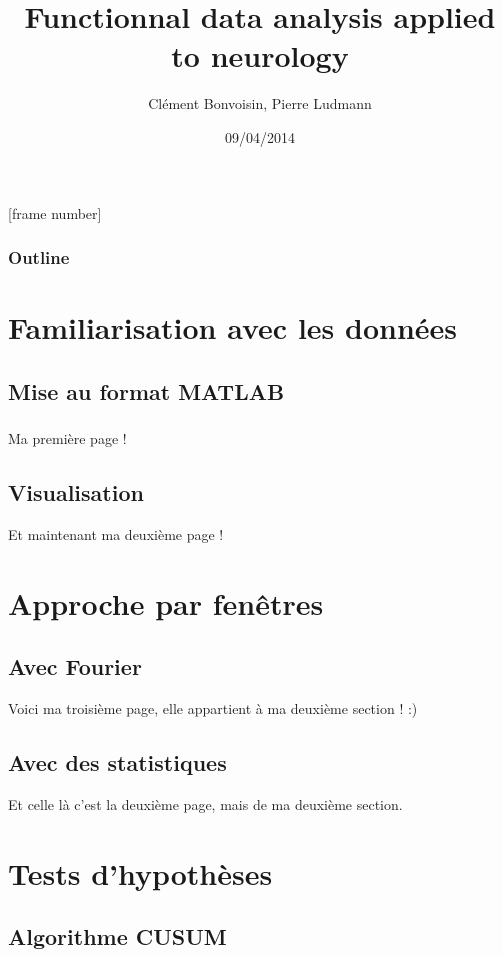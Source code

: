 \documentclass{beamer}
\title[Signal segmentation]{Functionnal data analysis applied to neurology}
\author{Clément Bonvoisin, Pierre Ludmann}
\institute{CMLA (ENS Cachan), Cognac-G (Paris V)}
\date{09/04/2014}
\begin{document}
[frame number]

\begin{frame}
\titlepage
\end{frame}

\begin{frame}
\frametitle{Outline}
  \tableofcontents[hideallsubsections]
\end{frame}


\section{Familiarisation avec les données}
\subsection{Mise au format MATLAB}

\begin{frame}
\frametitle{}
Ma première page !
\insertframenumber{}
\inserttotalframenumber
\end{frame}

\subsection{Visualisation}
\begin{frame}
Et maintenant ma deuxième page !
\end{frame}



\section{Approche par fenêtres}
\subsection{Avec Fourier}

\begin{frame}
Voici ma troisième page, elle appartient à ma deuxième section ! :) 
\end{frame}

\subsection{Avec des statistiques}
\begin{frame}
Et celle là c'est la deuxième page, mais de ma deuxième section. 
\end{frame}

\section{Tests d'hypothèses}
\subsection{}
\subsection{Algorithme CUSUM}
\end{document}
